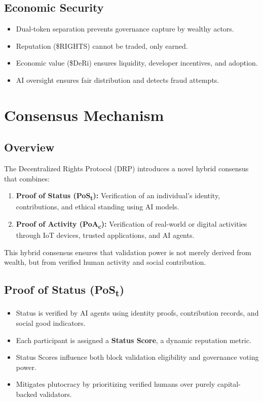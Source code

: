 \documentclass[11pt,a4paper]{article}
\begin{document}
\subsection{Economic Security}
\begin{itemize}
    \item Dual-token separation prevents governance capture by wealthy actors.
    \item Reputation (\$RIGHTS) cannot be traded, only earned.
    \item Economic value (\$DeRi) ensures liquidity, developer incentives, and adoption.
    \item AI oversight ensures fair distribution and detects fraud attempts.
\end{itemize}

\section{Consensus Mechanism}

\subsection{Overview}
The Decentralized Rights Protocol (DRP) introduces a novel hybrid consensus that combines:
\begin{enumerate}
    \item \textbf{Proof of Status (PoS\textsubscript{t}):} Verification of an individual’s identity, contributions, and ethical standing using AI models.
    \item \textbf{Proof of Activity (PoA\textsubscript{c}):} Verification of real-world or digital activities through IoT devices, trusted applications, and AI agents.
\end{enumerate}

This hybrid consensus ensures that validation power is not merely derived from wealth, but from verified human activity and social contribution.

\subsection{Proof of Status (PoS\textsubscript{t})}
\begin{itemize}
    \item Status is verified by AI agents using identity proofs, contribution records, and social good indicators.
    \item Each participant is assigned a \textbf{Status Score}, a dynamic reputation metric.
    \item Status Scores influence both block validation eligibility and governance voting power.
    \item Mitigates plutocracy by prioritizing verified humans over purely capital-backed validators.
\end{itemize}
\end{document}
